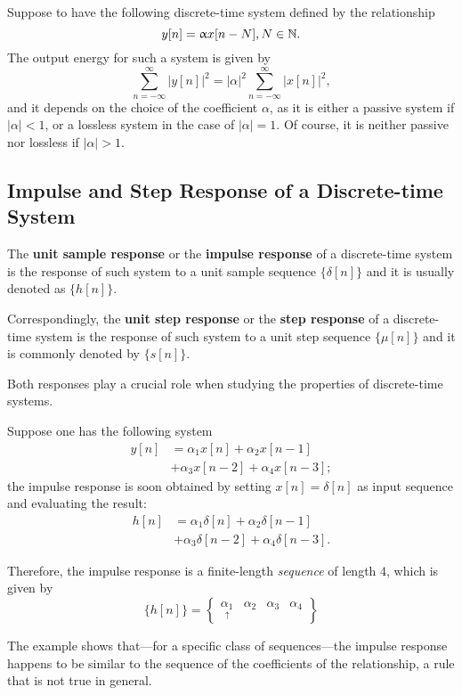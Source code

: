 \documentclass[\documentfontsize, twocolumn]{\classname}
\begin{document}
Suppose to have the following discrete-time system defined by the relationship
\[
    y[n] = \upalpha x[n-N], N\in\mathbb N.
\]
The output energy for such a system is given by
\[
    \sum_{n=-\infty}^{\infty} |y[n]|^2 = |\alpha|^2 \sum_{n=-\infty}^{\infty}|x[n]|^2,
\]
and it depends on the choice of the coefficient $\alpha$, as it is either a passive system if $|\alpha| < 1$, or a lossless system in the case of $|\alpha| = 1$. Of course, it is neither passive nor lossless if $|\alpha| > 1$.

\subsection{Impulse and Step Response of a Discrete-time System}

The \textbf{unit sample response} or the \textbf{impulse response} of a discrete-time system is the response of such system to a unit sample sequence $\{\delta[n]\}$ and it is usually denoted as $\{h[n]\}$.

Correspondingly, the \textbf{unit step response} or the \textbf{step response} of a discrete-time system is the response of such system to a unit step sequence $\{\mu[n]\}$ and it is commonly denoted by $\{s[n]\}$.

Both responses play a crucial role when studying the properties of discrete-time systems.

Suppose one has the following system
\begin{align*}
    y[n] &= \alpha_1 x[n] + \alpha_2 x[n-1]\\
               &+ \alpha_3 x[n-2] + \alpha_4 x[n-3];
\end{align*}
the impulse response is soon obtained by setting $x[n] = \delta[n]$ as input sequence and evaluating the result:
\begin{align*}
    h[n] &= \alpha_1 \delta[n] + \alpha_2 \delta[n-1]\\
               &+ \alpha_3 \delta[n-2] + \alpha_4 \delta[n-3].
\end{align*}

Therefore, the impulse response is a finite-length \emph{sequence} of length $4$, which is given by
\[
    \{h[n]\} = \begin{Bmatrix}\underset{\uparrow}{\alpha_1} & \alpha_2 & \alpha_3 & \alpha_4\end{Bmatrix}
\]

The example shows that---for a specific class of sequences---the impulse response happens to be similar to the sequence of the coefficients of the relationship, a rule that is not true in general.
\end{document}

